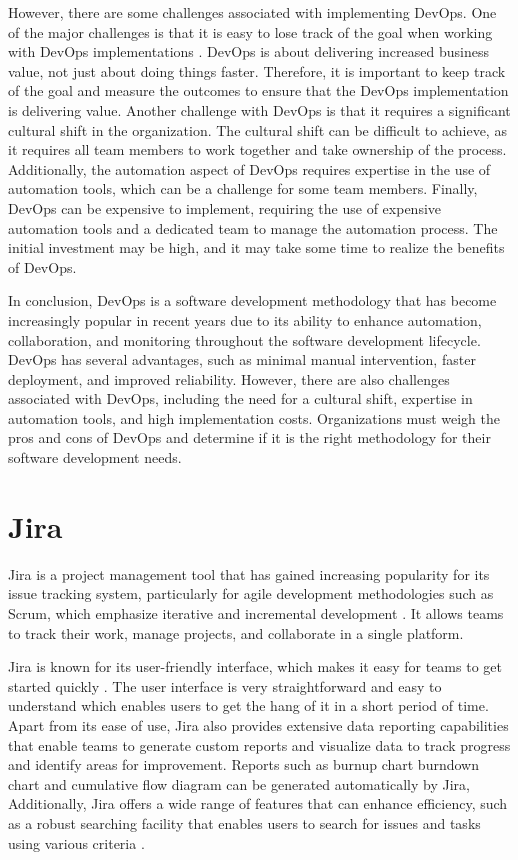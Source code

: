 However, there are some challenges associated with implementing DevOps. One of the major challenges is that it is easy to lose track of the goal when working with DevOps implementations \cite{joakim}. DevOps is about delivering increased business value, not just about doing things faster. Therefore, it is important to keep track of the goal and measure the outcomes to ensure that the DevOps implementation is delivering value. Another challenge with DevOps is that it requires a significant cultural shift in the organization. The cultural shift can be difficult to achieve, as it requires all team members to work together and take ownership of the process. Additionally, the automation aspect of DevOps requires expertise in the use of automation tools, which can be a challenge for some team members. Finally, DevOps can be expensive to implement, requiring the use of expensive automation tools and a dedicated team to manage the automation process. The initial investment may be high, and it may take some time to realize the benefits of DevOps.

In conclusion, DevOps is a software development methodology that has become increasingly popular in recent years due to its ability to enhance automation, collaboration, and monitoring throughout the software development lifecycle. DevOps has several advantages, such as minimal manual intervention, faster deployment, and improved reliability. However, there are also challenges associated with DevOps, including the need for a cultural shift, expertise in automation tools, and high implementation costs. Organizations must weigh the pros and cons of DevOps and determine if it is the right methodology for their software development needs.

\section{Jira}
Jira is a project management tool that has gained increasing popularity for its issue tracking system, particularly for agile development methodologies such as Scrum, which emphasize iterative and incremental development \cite{patrick2, ravis, davidh}. It allows teams to track their work, manage projects, and collaborate in a single platform. 

Jira is known for its user-friendly interface, which makes it easy for teams to get started quickly \cite{patrick1}. The user interface is very straightforward and easy to understand which enables users to get the hang of it in a short period of time. Apart from its ease of use, Jira also provides extensive data reporting capabilities that enable teams to generate custom reports and visualize data to track progress and identify areas for improvement. Reports such as burnup chart burndown chart and cumulative flow diagram can be generated automatically by Jira,  Additionally, Jira offers a wide range of features that can enhance efficiency, such as a robust searching facility that enables users to search for issues and tasks using various criteria \cite{patrick1, ravis}.


